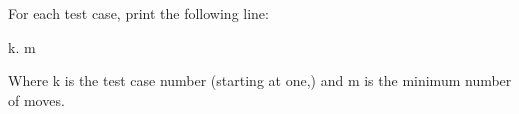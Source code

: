 For each test case, print the following line:


k. m


Where k is the test case number (starting at one,) and m is the minimum number of moves.